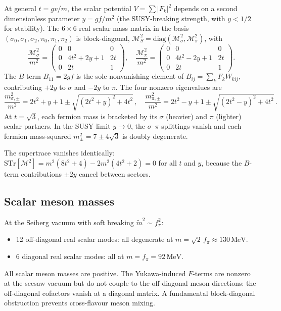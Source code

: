 \documentclass[12pt,a4paper]{article}
\newcommand{\MeV}{\,\text{MeV}}
\newcommand{\fpi}{f_\pi}
\begin{document}
At general $t = gv/m$, the scalar potential $V = \sum|F_k|^2$
depends on a second dimensionless parameter $y = gf/m^2$ (the
SUSY-breaking strength, with $y < 1/2$ for stability).
The $6\times 6$ real scalar mass matrix in the basis
$(\sigma_0,\sigma_1,\sigma_2,\pi_0,\pi_1,\pi_2)$ is block-diagonal,
$\mathcal{M}^2_S = \mathrm{diag}(\mathcal{M}^2_\sigma,
\mathcal{M}^2_\pi)$, with
\begin{equation}
  \frac{\mathcal{M}^2_\sigma}{m^2}
  = \begin{pmatrix} 0 & 0 & 0 \\ 0 & 4t^2{+}2y{+}1 & 2t \\
    0 & 2t & 1 \end{pmatrix}, \quad
  \frac{\mathcal{M}^2_\pi}{m^2}
  = \begin{pmatrix} 0 & 0 & 0 \\ 0 & 4t^2{-}2y{+}1 & 2t \\
    0 & 2t & 1 \end{pmatrix}.
\end{equation}
The $B$-term $B_{11} = 2gf$ is the sole nonvanishing element of
$B_{ij} = \sum_k F_k W_{kij}$, contributing $+2y$ to $\sigma$
and $-2y$ to $\pi$. The four nonzero eigenvalues are
\begin{equation}
  \frac{m^2_{\sigma,\pm}}{m^2}
    = 2t^2 + y + 1 \pm \sqrt{(2t^2+y)^2+4t^2}\,,\quad
  \frac{m^2_{\pi,\pm}}{m^2}
    = 2t^2 - y + 1 \pm \sqrt{(2t^2-y)^2+4t^2}\,.
\end{equation}
At $t = \sqrt{3}$, each fermion mass is bracketed by its
$\sigma$ (heavier) and $\pi$ (lighter) scalar partners.
In the SUSY limit $y \to 0$, the $\sigma$--$\pi$ splittings vanish
and each fermion mass-squared $m^2_\pm = 7 \pm 4\sqrt{3}$ is
doubly degenerate.

The supertrace vanishes identically:
$\mathrm{STr}[\mathcal{M}^2] = m^2(8t^2{+}4) - 2m^2(4t^2{+}2) = 0$
for all $t$ and $y$, because the $B$-term contributions
$\pm 2y$ cancel between sectors.

\subsection{Scalar meson masses}

At the Seiberg vacuum with soft breaking $\tilde{m}^2 \sim \fpi^2$:
\begin{itemize}
\item 12 off-diagonal real scalar modes: all degenerate at
$m = \sqrt{2}\,\fpi \approx 130\MeV$.
\item 6 diagonal real scalar modes: all at
$m = \fpi = 92\MeV$.
\end{itemize}
All scalar meson masses are positive. The
Yukawa-induced $F$-terms are nonzero at the seesaw vacuum but do not
couple to the off-diagonal meson directions: the off-diagonal
cofactors vanish at a diagonal matrix. A fundamental block-diagonal
obstruction prevents cross-flavour meson mixing.
\end{document}
